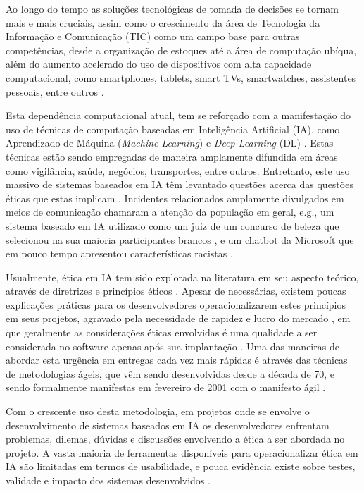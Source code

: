 \label{introducao}

Ao longo do tempo as soluções tecnológicas de tomada de decisões se tornam mais e mais cruciais, assim como o crescimento da área de Tecnologia da Informação e Comunicação (TIC) como um campo base para outras competências, desde a organização de estoques até a área de computação ubíqua, além do aumento acelerado do uso de dispositivos com alta capacidade computacional, como smartphones, tablets, smart TVs, smartwatches, assistentes pessoais, entre outros \cite{Sommerville07}.

Esta dependência computacional atual, tem se reforçado com a manifestação do uso de técnicas de computação baseadas em Inteligência Artificial (IA), como Aprendizado de Máquina (\textit{Machine Learning}) e \textit{Deep Learning} (DL) \cite{vogelsang2019requirements, morley2019initial}. Estas técnicas estão sendo empregadas de maneira amplamente difundida em áreas como vigilância, saúde, negócios, transportes, entre outros. Entretanto, este uso massivo de sistemas baseados em IA têm levantado questões acerca das questões éticas que estas implicam \cite{vakkuri2020current,morley2019initial}. Incidentes relacionados amplamente divulgados em meios de comunicação chamaram a atenção da população em geral, e.g., um sistema baseado em IA utilizado como um juiz de um concurso de beleza que selecionou na sua maioria participantes brancos \cite{RacialAIJudge}, e um chatbot da Microsoft que em pouco tempo apresentou características racistas \cite{MicrosoftRacistChatbox}.

Usualmente, ética em IA tem sido explorada na literatura em seu aspecto teórico, através de diretrizes e princípios éticos \cite{mittelstadt2019principles}. Apesar de necessárias, existem poucas explicações práticas para os desenvolvedores operacionalizarem estes princípios em seus projetos, agravado pela necessidade de rapidez e lucro do mercado \cite{mittelstadt2019principles}, em que geralmente as considerações éticas envolvidas é uma qualidade a ser considerada no software apenas após sua implantação \cite{ECCOLA}. Uma das maneiras de abordar esta urgência em entregas cada vez mais rápidas é através das técnicas de metodologias ágeis, que vêm sendo desenvolvidas desde a década de 70, e sendo formalmente manifestas em fevereiro de 2001 com o manifesto ágil \cite{agilemanifesto}. 

Com o crescente uso desta metodologia, em projetos onde se envolve o desenvolvimento de sistemas baseados em \acrshort{IA} os desenvolvedores enfrentam problemas, dilemas, dúvidas e discussões envolvendo a ética a ser abordada no projeto. A vasta maioria de ferramentas disponíveis para operacionalizar ética em IA são limitadas em termos de usabilidade, e pouca evidência existe sobre testes, validade e impacto dos sistemas desenvolvidos \cite{morley2021EthicsAsAService}.

